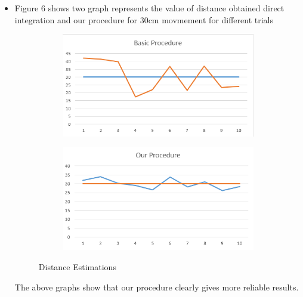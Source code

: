 \documentclass{article}
\begin{document}
\begin{itemize}
			\item Figure 6 shows two graph represents the value of distance obtained direct integration and our procedure for 30cm movmement for different trials
				\begin{figure}[H]
					\centering
					\begin{subfigure}{.5\textwidth}
					  	\centering
					  	\includegraphics[width=1.0\linewidth]{basicproc.png}
					  	\caption{}
					  	\label{fig:sub1}
					\end{subfigure}%
					\begin{subfigure}{.5\textwidth}
					  	\centering
					  	\includegraphics[width=1.0\linewidth]{ourproc.png}
					  	\caption{}
					  	\label{fig:sub2}
					\end{subfigure}
					\caption{Distance Estimations}
					\label{figstart}
			\end{figure}
			The above graphs show that our procedure clearly gives more reliable results.


\end{itemize}
\end{document}
